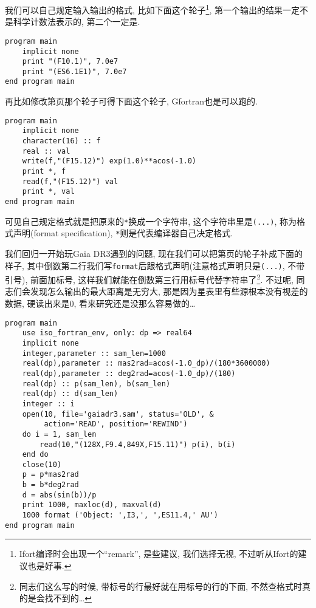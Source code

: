 我们可以自己规定输入输出的格式, 比如下面这个轮子\footnote{Ifort编译时会出现一个``remark'', 是些建议, 我们选择无视, 不过听从Ifort的建议也是好事.}, 第一个输出的结果一定不是科学计数法表示的, 第二个一定是. 
\begin{verbatim}
program main
    implicit none
    print "(F10.1)", 7.0e7
    print "(ES6.1E1)", 7.0e7
end program main
\end{verbatim}
再比如修改第\pageref{internal_file}页那个轮子可得下面这个轮子, Gfortran也是可以跑的.
\begin{verbatim}
program main
    implicit none
    character(16) :: f
    real :: val
    write(f,"(F15.12)") exp(1.0)**acos(-1.0)
    print *, f
    read(f,"(F15.12)") val
    print *, val
end program main
\end{verbatim}
可见自己规定格式就是把原来的\verb|*|换成一个字符串, 这个字符串里是\verb|(...)|, 称为格式声明(format specification), \verb|*|则是代表编译器自己决定格式.

我们回归一开始玩Gaia DR3遇到的问题, 现在我们可以把第\pageref{gaiadr3.sam}页的轮子补成下面的样子, 其中倒数第二行我们写\verb|format|后跟格式声明(注意格式声明只是\verb|(...)|, 不带引号), 前面加标号, 这样我们就能在倒数第三行用标号代替字符串了\footnote{同志们这么写的时候, 带标号的行最好就在用标号的行的下面, 不然查格式时真的是会找不到的\dots}. 不过呢, 同志们会发现怎么输出的最大距离是无穷大, 那是因为星表里有些源根本没有视差的数据, 硬读出来是$0$, 看来研究还是没那么容易做的\dots
\begin{verbatim}
program main
    use iso_fortran_env, only: dp => real64
    implicit none
    integer,parameter :: sam_len=1000
    real(dp),parameter :: mas2rad=acos(-1.0_dp)/(180*3600000)
    real(dp),parameter :: deg2rad=acos(-1.0_dp)/(180)
    real(dp) :: p(sam_len), b(sam_len)
    real(dp) :: d(sam_len)
    integer :: i
    open(10, file='gaiadr3.sam', status='OLD', &
         action='READ', position='REWIND')
    do i = 1, sam_len
        read(10,"(128X,F9.4,849X,F15.11)") p(i), b(i)
    end do
    close(10)
    p = p*mas2rad
    b = b*deg2rad
    d = abs(sin(b))/p
    print 1000, maxloc(d), maxval(d)
    1000 format ('Object: ',I3,', ',ES11.4,' AU')
end program main
\end{verbatim}

